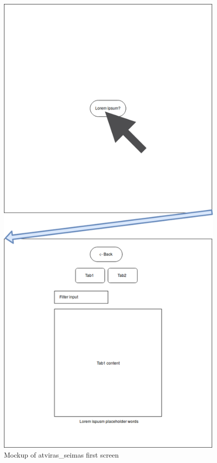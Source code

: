 \documentclass[a4paper,12pt]{article}
\begin{document}
	\begin{figure}[H]	
		\centering
		\includegraphics[width=11.5cm]{images/frontend_mockup_crop_1.png}
		\caption{Mockup of \gls{atviras_seimas} first screen}
		\label{fig:frontend_mockup}
	\end{figure}
	
\end{document}
